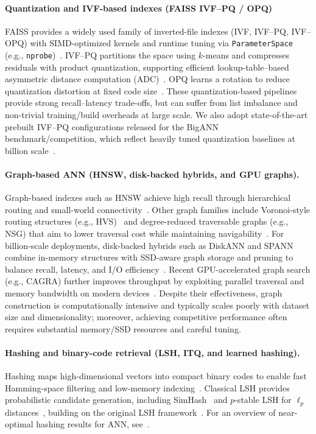 \documentclass[sigconf, nonacm]{acmart}
\begin{document}
\paragraph{Quantization and IVF-based indexes (FAISS IVF--PQ / OPQ)}
FAISS provides a widely used family of inverted-file indexes (IVF, IVF--PQ, IVF--OPQ) with
SIMD-optimized kernels and runtime tuning via \texttt{ParameterSpace}
(e.g., \texttt{nprobe})~\cite{johnson2017billionscalesimilaritysearchgpus,ref40}.
IVF--PQ partitions the space using $k$-means and compresses residuals with product quantization,
supporting efficient lookup-table--based asymmetric distance computation (ADC)~\cite{5432202}.
OPQ learns a rotation to reduce quantization distortion at fixed code size~\cite{6678503}.
These quantization-based pipelines provide strong recall--latency trade-offs, but can suffer from
list imbalance and non-trivial training/build overheads at large scale. We also
adopt state-of-the-art prebuilt IVF--PQ configurations released for the BigANN benchmark/competition,
which reflect heavily tuned quantization baselines at billion scale~\cite{simhadri2022bigann,bigann_readme}.

\paragraph{Graph-based ANN (HNSW, disk-backed hybrids, and GPU graphs).}
Graph-based indexes such as HNSW achieve high recall through hierarchical routing and small-world
connectivity~\cite{27,33}. Other graph families include Voronoi-style routing structures (e.g., HVS)~\cite{34}
and degree-reduced traversable graphs (e.g., NSG) that aim to lower traversal cost while maintaining
navigability~\cite{CongFu}. For billion-scale deployments, disk-backed hybrids such as DiskANN and SPANN
combine in-memory structures with SSD-aware graph storage and pruning to balance recall, latency,
and I/O efficiency~\cite{NEURIPS2019_09853c7f,NEURIPS2021_299dc35e}. Recent GPU-accelerated graph search
(e.g., CAGRA) further improves throughput by exploiting parallel traversal and memory bandwidth on
modern devices~\cite{ootomo2024cagrahighlyparallelgraph}. Despite their effectiveness, graph construction
is computationally intensive and typically scales poorly with dataset size and dimensionality; moreover,
achieving competitive performance often requires substantial memory/SSD resources and careful tuning.

\paragraph{Hashing and binary-code retrieval (LSH, ITQ, and learned hashing).}
Hashing maps high-dimensional vectors into compact binary codes to enable fast Hamming-space filtering
and low-memory indexing~\cite{hash,Liong_2015_CVPR,Lai_2015}. Classical LSH provides probabilistic candidate generation, including SimHash~\cite{10.1145/509907.509965} and $p$-stable LSH for $\ell_p$ distances~\cite{10.1145/997817.997857}, building on the original LSH framework~\cite{10.1145/276698.276876,26,10.14778/3594512.3594527,31,35}. For an overview of near-optimal hashing results for ANN, see~\cite{10.1145/1327452.1327494}.
\end{document}
